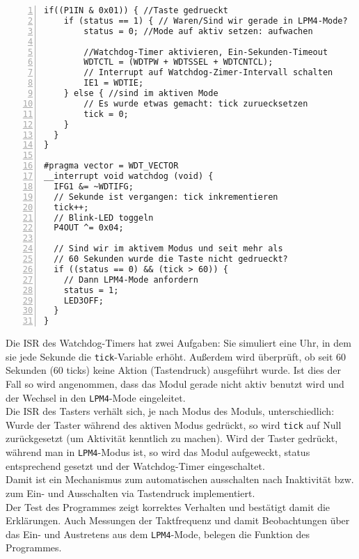 \documentclass[11pt,a4paper,ngerman]{article}
\begin{document}
\begin{description}
\begin{lstlisting}[numbers=left]
  if((P1IN & 0x01)) { //Taste gedrueckt
  	if (status == 1) { // Waren/Sind wir gerade in LPM4-Mode?
  		status = 0; //Mode auf aktiv setzen: aufwachen
  		
  		//Watchdog-Timer aktivieren, Ein-Sekunden-Timeout
  		WDTCTL = (WDTPW + WDTSSEL + WDTCNTCL);
  		// Interrupt auf Watchdog-Zimer-Intervall schalten
  		IE1 = WDTIE;
  	} else { //sind im aktiven Mode
  		// Es wurde etwas gemacht: tick zuruecksetzen
  		tick = 0;
  	}
  }
}

#pragma vector = WDT_VECTOR
__interrupt void watchdog (void) {
  IFG1 &= ~WDTIFG;
  // Sekunde ist vergangen: tick inkrementieren
  tick++;
  // Blink-LED toggeln
  P4OUT ^= 0x04;
  
  // Sind wir im aktivem Modus und seit mehr als
  // 60 Sekunden wurde die Taste nicht gedrueckt?
  if ((status == 0) && (tick > 60)) {
    // Dann LPM4-Mode anfordern
  	status = 1;
  	LED3OFF;
  }
}

	\end{lstlisting}
	
	Die ISR des Watchdog-Timers hat zwei Aufgaben: Sie simuliert eine Uhr, in dem sie jede Sekunde die \texttt{tick}-Variable erhöht. Außerdem wird überprüft, ob seit 60 Sekunden (60 ticks) keine Aktion (Tastendruck) ausgeführt wurde. Ist dies der Fall so wird angenommen, dass das Modul gerade nicht aktiv benutzt wird und der Wechsel in den \texttt{LPM4}-Mode eingeleitet.\\
	Die ISR des Tasters verhält sich, je nach Modus des Moduls, unterschiedlich: Wurde der Taster während des aktiven Modus gedrückt, so wird \texttt{tick} auf Null zurückgesetzt (um Aktivität kenntlich zu machen). Wird der Taster gedrückt, während man in \texttt{LPM4}-Modus ist, so wird das Modul aufgeweckt, status entsprechend gesetzt und der Watchdog-Timer eingeschaltet. \\
	Damit ist ein Mechanismus zum automatischen ausschalten nach Inaktivität bzw. zum Ein- und Ausschalten via Tastendruck implementiert.\\
	
	Der Test des Programmes zeigt korrektes Verhalten und bestätigt damit die Erklärungen. Auch Messungen der Taktfrequenz und damit Beobachtungen über das Ein- und Austretens aus dem \texttt{LPM4}-Mode, belegen die Funktion des Programmes.
\end{description}
\end{document}
